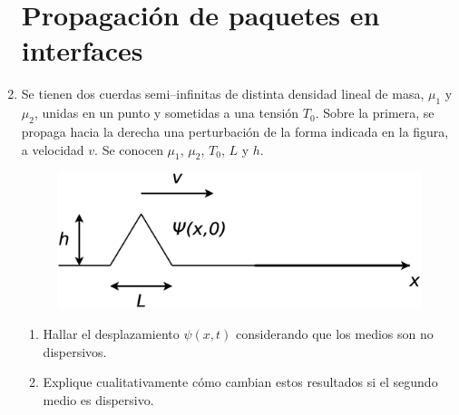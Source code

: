 \documentclass[11pt,spanish]{article}
\begin{document}
\begin{enumerate}
\begin{enumerate}
    \end{enumerate}


\section*{Propagación de paquetes en interfaces}


	\item Se tienen dos cuerdas semi--infinitas de distinta densidad lineal de
    masa, $\mu_{1}$ y $\mu_{2}$, unidas en un punto y sometidas a una tensión
    $T_0$. Sobre la primera, se propaga hacia la derecha una perturbación de la
    forma indicada en la figura, a velocidad $v$. Se conocen $\mu_{1}$,
    $\mu_{2}$, $T_0$, $L$ y $h$.

	\begin{figure}[H]
		\centering{}\includegraphics[clip,scale=0.25]{figs/ej2-20}
	\end{figure}

	\begin{enumerate}
		\item Hallar el desplazamiento $\psi(x,t)$ considerando que los medios
    	son no dispersivos.

		\item Explique cualitativamente cómo cambian estos resultados si el
        segundo medio es dispersivo.
	\end{enumerate}
    
\end{enumerate}
\end{document}
